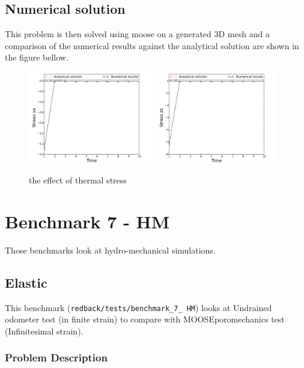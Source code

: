 \documentclass[]{scrreprt}
\newcommand{\moose}{{MOOSE}}
\begin{document}
\subsection{Numerical solution}
This problem is then solved using moose on a generated 3D mesh and a comparison of the numerical results against the analytical solution are shown in the figure bellow.
\begin{figure}
\label{fig:benchmark6_TM_elastic}
  \centering
  \includegraphics[width=0.48\textwidth]{benchmark_6_TM/benchmark_6_TM_bench_TM_elastic_stress_xx}
  \includegraphics[width=0.48\textwidth]{benchmark_6_TM/benchmark_6_TM_bench_TM_elastic_stress_zz}\\
  \caption{the effect of thermal stress }
 \end{figure}

\section{Benchmark 7 - HM}
Those benchmarks look at hydro-mechanical simulations.

\subsection{Elastic}
\label{subsec:bench_7_elastic}
 This benchmark (\texttt{redback/tests/benchmark\_7\_ HM}) looks at Undrained odometer test (in finite strain) to compare with \moose poromechanics test (Infinitesimal strain).
\subsubsection{Problem Description}
\end{document}

